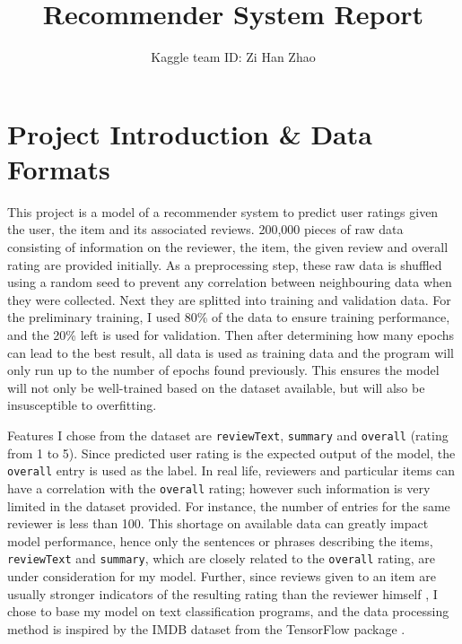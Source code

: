 \documentclass[12pt]{article}
\author{\vspace{-0.5cm}Kaggle team ID: Zi Han Zhao}
\title{\vspace{-2cm}Recommender System Report}
\date{}
\begin{document}
\maketitle
\vspace{-1.5cm}
\section{Project Introduction \& Data Formats}
\vspace{-0.3cm}
This project is a model of a recommender system to predict user ratings given the user, the item and its associated reviews. 200,000 pieces of raw data consisting of information on the reviewer, the item, the given review and overall rating are provided initially. As a preprocessing step, these raw data is shuffled using a random seed to prevent any correlation between neighbouring data when they were collected. Next they are splitted into training and validation data. For the preliminary training, I used 80\% of the data to ensure training performance, and the 20\% left is used for validation. Then after determining how many epochs can lead to the best result, all data is used as training data and the program will only run up to the number of epochs found previously. This ensures the model will not only be well-trained based on the dataset available, but will also be insusceptible to overfitting.

Features I chose from the dataset are \texttt{reviewText}, \texttt{summary} and \texttt{overall} (rating from 1 to 5). Since predicted user rating is the expected output of the model, the \texttt{overall} entry is used as the label. In real life, reviewers and particular items can have a correlation with the \texttt{overall} rating; however such information is very limited in the dataset provided. For instance, the number of entries for the same reviewer is less than 100. This shortage on available data can greatly impact model performance, hence only the sentences or phrases describing the items, \texttt{reviewText} and \texttt{summary}, which are closely related to the \texttt{overall} rating, are under consideration for my model. Further, since reviews given to an item are usually stronger indicators of the resulting rating than the reviewer himself , I chose to base my model on text classification programs, and the data processing method is inspired by the IMDB dataset from the TensorFlow package \cite{imdb}.
\end{document}
